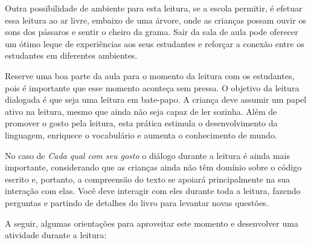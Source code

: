 \documentclass[11pt]{extarticle}
\begin{document}

Outra possibilidade de ambiente para esta leitura, se a escola permitir, 
é efetuar essa leitura ao ar livre, embaixo de uma árvore, onde as crianças 
possam ouvir os sons dos pássaros e sentir o cheiro da grama. Sair da sala 
de aula pode oferecer um ótimo leque de experiências aos seus estudantes e 
reforçar a conexão entre os estudantes em diferentes ambientes.  

Reserve uma boa parte da aula para o momento da leitura com os estudantes, 
pois é importante que esse momento aconteça sem pressa. O objetivo da 
leitura dialogada é que seja uma leitura em bate-papo. A criança deve 
assumir um papel ativo na leitura, mesmo que ainda não seja capaz de 
ler sozinha. Além de promover o gosto pela leitura, esta prática estimula 
o desenvolvimento da linguagem, enriquece o vocabulário e 
aumenta o conhecimento de mundo.

No caso de \textit{Cada qual com seu gosto} o diálogo durante a leitura é 
ainda mais importante, considerando que as crianças ainda não têm domínio sobre o código escrito e, portanto, a compreensão do texto se apoiará principalmente na sua interação com elas. 
Você deve interagir com eles durante toda a 
leitura, fazendo perguntas e partindo de detalhes do livro para 
levantar novas questões. 

A seguir, algumas orientações para aproveitar este momento e desenvolver uma atividade durante a leitura: 
\end{document}
